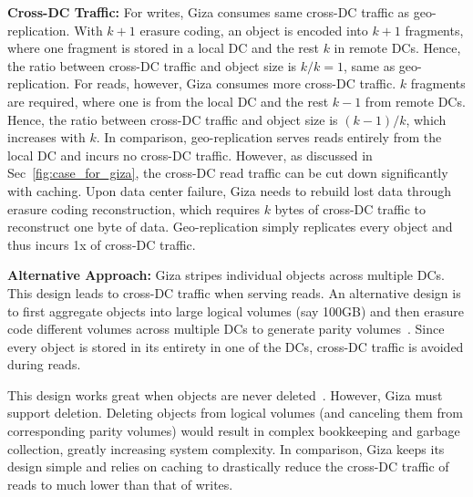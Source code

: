 {\bf Cross-DC Traffic:} For writes, Giza consumes same cross-DC traffic as geo-replication. With $k+1$ erasure coding, an object is encoded into $k+1$ fragments, where one fragment is stored in a local DC and the rest $k$ in remote DCs. Hence, the ratio between cross-DC traffic and object size is $k/k = 1$, same as geo-replication.
For reads, however, Giza consumes more cross-DC traffic. $k$ fragments are required, where one is from the local DC and the rest $k-1$ from remote DCs. Hence, the ratio between cross-DC traffic and object size is $(k-1)/k$, which increases with $k$. In comparison, geo-replication serves reads entirely from the local DC and incurs no cross-DC traffic.  However, as discussed in Sec~\ref{fig:case_for_giza}, the cross-DC read traffic can be cut down significantly with caching.
Upon data center failure, Giza needs to rebuild lost data through erasure coding reconstruction, which requires $k$ bytes of cross-DC traffic to reconstruct one byte of data. Geo-replication simply replicates every object and thus incurs 1x of cross-DC traffic.

{\bf Alternative Approach:} Giza stripes individual objects across multiple DCs. This design leads to cross-DC traffic when serving reads. An alternative design is to first aggregate objects into large logical volumes (say 100GB) and then erasure code different volumes across multiple DCs to generate parity volumes~\cite{f4:osdi14}. Since every object is stored in its entirety in one of the DCs, cross-DC traffic is avoided during reads.

This design works great when objects are never deleted~\cite{f4:osdi14}. However, Giza must support deletion. Deleting objects from logical volumes (and canceling them from corresponding parity volumes) would result in complex bookkeeping and garbage collection, greatly increasing system complexity. In comparison, Giza keeps its design simple and relies on caching to drastically reduce the cross-DC traffic of reads to much lower than that of writes. 

